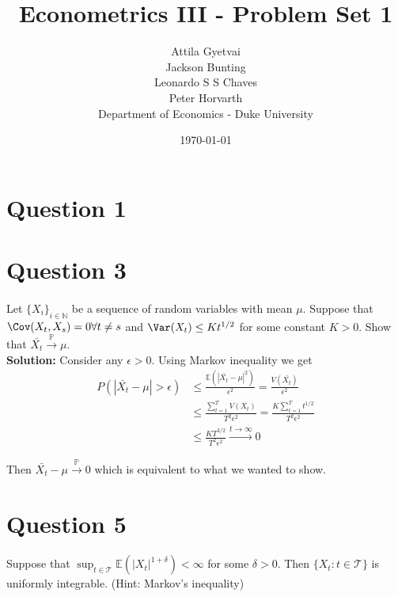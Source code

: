 \documentclass[10pt]{article}
\title{Econometrics III - Problem Set 1}
\author{Attila Gyetvai \\
Jackson Bunting \\
Leonardo S S Chaves \\
Peter Horvarth \\
Department of Economics - Duke University}
\date{\today}
\begin{document}
\maketitle

\section*{Question 1}

\paragraph{}


\section*{Question 3}

\paragraph{}Let $\{X_i\}_{i \in \mathbb{N}}$ be a sequence of random variables with mean $\mu$. Suppose that $\Cov(X_t,X_s)=0 \forall t\neq s$ and $\Var(X_t) \leq Kt^{1/2}$ for some constant $K>0$. Show that $\bar{X_t} \overset{\mathbb{P}}{\rightarrow} \mu$.\\

\textbf{Solution:} Consider any $\epsilon>0$. Using Markov inequality we get
\begin{align*}
P(|\bar{X_t} - \mu| > \epsilon) &\leq \frac{\mathbb{E}( |\bar{X_t} - \mu|^2)}{\epsilon^2} = \frac{V(\bar{X_t})}{\epsilon^2} \\
&\leq \frac{\sum_{t=1}^T V(X_t)}{T^2 \epsilon^2} = \frac{K \sum_{t=1}^T t^{1/2}}{T^2 \epsilon^2} \\
&\leq \frac{K T^{3/2}}{T^2 \epsilon^2} \overset{t \to \infty}{\rightarrow} 0
\end{align*}

Then $\bar{X_t} - \mu \overset{\mathbb{P}}{\rightarrow} 0$ which is equivalent to what we wanted to show.


\section*{Question 5}

\paragraph{}Suppose that $\sup_{t \in \mathcal{T}} \mathbb{E}(|X_t|^{1+\delta}) < \infty$ for some $\delta >0$. Then $\{X_t : t \in \mathcal{T}\}$ is uniformly integrable. (Hint: Markov's inequality) \\
\end{document}
